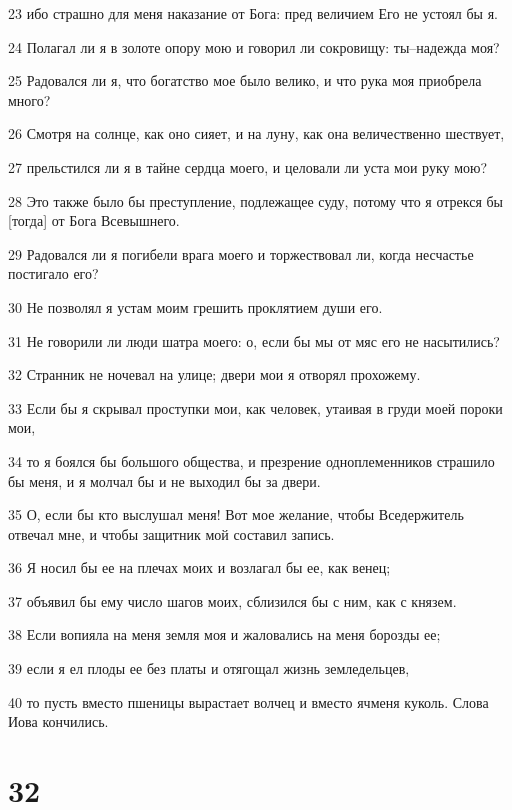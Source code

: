 \par 23 ибо страшно для меня наказание от Бога: пред величием Его не устоял бы я.
\par 24 Полагал ли я в золоте опору мою и говорил ли сокровищу: ты--надежда моя?
\par 25 Радовался ли я, что богатство мое было велико, и что рука моя приобрела много?
\par 26 Смотря на солнце, как оно сияет, и на луну, как она величественно шествует,
\par 27 прельстился ли я в тайне сердца моего, и целовали ли уста мои руку мою?
\par 28 Это также было бы преступление, подлежащее суду, потому что я отрекся бы [тогда] от Бога Всевышнего.
\par 29 Радовался ли я погибели врага моего и торжествовал ли, когда несчастье постигало его?
\par 30 Не позволял я устам моим грешить проклятием души его.
\par 31 Не говорили ли люди шатра моего: о, если бы мы от мяс его не насытились?
\par 32 Странник не ночевал на улице; двери мои я отворял прохожему.
\par 33 Если бы я скрывал проступки мои, как человек, утаивая в груди моей пороки мои,
\par 34 то я боялся бы большого общества, и презрение одноплеменников страшило бы меня, и я молчал бы и не выходил бы за двери.
\par 35 О, если бы кто выслушал меня! Вот мое желание, чтобы Вседержитель отвечал мне, и чтобы защитник мой составил запись.
\par 36 Я носил бы ее на плечах моих и возлагал бы ее, как венец;
\par 37 объявил бы ему число шагов моих, сблизился бы с ним, как с князем.
\par 38 Если вопияла на меня земля моя и жаловались на меня борозды ее;
\par 39 если я ел плоды ее без платы и отягощал жизнь земледельцев,
\par 40 то пусть вместо пшеницы вырастает волчец и вместо ячменя куколь. Слова Иова кончились.

\chapter{32}

